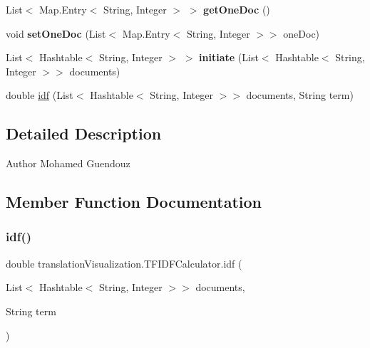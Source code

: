 \begin{DoxyCompactItemize}
List$<$ Map.\+Entry$<$ String, Integer $>$ $>$ {\bfseries get\+One\+Doc} ()
\item 
\mbox{\label{classtranslation_visualization_1_1_t_f_i_d_f_calculator_a64251c1bdf686853c836ba6f34624164}} 
void {\bfseries set\+One\+Doc} (List$<$ Map.\+Entry$<$ String, Integer $>$$>$ one\+Doc)
\item 
\mbox{\label{classtranslation_visualization_1_1_t_f_i_d_f_calculator_a8123f80fe4f52c0ebe64de416850b732}} 
List$<$ Hashtable$<$ String, Integer $>$ $>$ {\bfseries initiate} (List$<$ Hashtable$<$ String, Integer $>$$>$ documents)
\item 
double \hyperlink{classtranslation_visualization_1_1_t_f_i_d_f_calculator_ad2d8c3cea991e56ac2c25dee58a65f07}{idf} (List$<$ Hashtable$<$ String, Integer $>$$>$ documents, String term)
\end{DoxyCompactItemize}


\subsection{Detailed Description}
\begin{DoxyAuthor}{Author}
Mohamed Guendouz 
\end{DoxyAuthor}


\subsection{Member Function Documentation}
\mbox{\label{classtranslation_visualization_1_1_t_f_i_d_f_calculator_ad2d8c3cea991e56ac2c25dee58a65f07}} 
\subsubsection{\texorpdfstring{idf()}{idf()}}
{\footnotesize\ttfamily double translation\+Visualization.\+T\+F\+I\+D\+F\+Calculator.\+idf (\begin{DoxyParamCaption}\item[{List$<$ Hashtable$<$ String, Integer $>$$>$}]{documents,  }\item[{String}]{term }\end{DoxyParamCaption})\hspace{0.3cm}{\ttfamily [inline]}}


